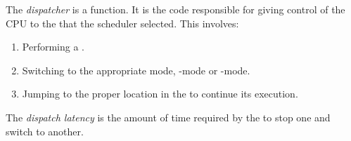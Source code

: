 \begin{definition}[Dispatcher]\label{def:Dispatcher}
  The \emph{dispatcher} is a  function.
  It is the code responsible for giving control of the CPU to the  that the scheduler selected.
  This involves:
  \begin{enumerate}[noitemsep]
  \item Performing a .
  \item Switching to the appropriate mode, -mode or -mode.
  \item Jumping to the proper location in the  to continue its execution.
  \end{enumerate}
\end{definition}

\begin{definition}\label{def:Dispatch_Latency}
  The \emph{dispatch latency} is the amount of time required by the  to stop one  and switch to another.
\end{definition}

